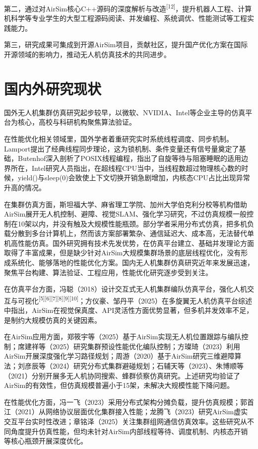 第二，通过对AirSim核心C++源码的深度解析与改造\textsuperscript{{[}12{]}}，提升机器人工程、计算机科学等专业学生的大型工程源码阅读、并发编程、系统调优、性能测试等工程实践能力。

第三，研究成果可集成到开源AirSim项目，贡献社区，提升国产优化方案在国际开源领域的影响力，推动无人机仿真技术的共同进步。

\section{国内外研究现状}

国外无人机集群仿真研究起步较早，以微软、NVIDIA、Intel等企业主导的仿真平台为核心，高校与科研机构聚焦算法验证。

在性能优化相关领域里，国外学者着重研究实时系统线程调度、同步机制。Lamport提出了经典线程同步理论，这为锁机制、条件变量还有信号量奠定了基础，Butenhof深入剖析了POSIX线程编程，指出了自旋等待与阻塞睡眠的适用边界所在，Intel研究人员指出，在超线程CPU当中，当线程数超过物理核心数的时候，yield()与sleep(0)会致使上下文切换开销急剧增加，内核态CPU占比出现异常升高的情况。

在集群仿真方面，斯坦福大学、麻省理工学院、加州大学伯克利分校等机构借助AirSim展开无人机控制、避障、视觉SLAM、强化学习研究，不过仿真规模一般控制在10架以内，并没有触及大规模性能瓶颈。部分学者采用分布式仿真，把多机负载分散到多台计算机上，然而该方案部署繁杂、通信延迟大、成本高，无法替代单机高性能仿真。国外研究拥有技术先发优势，在仿真平台建立、基础并发理论方面取得了丰富成果，但是缺少针对AirSim大规模集群场景的底层线程优化，没有形成系统化、能够落地的性能优化方案。国内无人机集群仿真研究近年来发展迅速，聚焦平台构建、算法验证、工程应用，性能优化研究逐步受到关注。

在仿真平台方面，冯聪（2018）设计交互式无人机集群编队仿真平台，强化人机交互与可视化\textsuperscript{{[}5{]}{[}6{]}{[}7{]}{[}8{]}{[}9{]}{[}10{]}}；方仪豪、邹丹平（2025）在多旋翼无人机仿真平台综述中指出，AirSim在视觉保真度、API灵活性方面优势显著，但多机并发效率不足，是制约大规模仿真的关键因素。

在AirSim应用方面，郑筱宇等（2025）基于AirSim实现无人机位置跟踪与编队控制；席建祥等（2025）研究集群预设性能优化编队控制；方璨琦（2023）利用AirSim开展深度强化学习路径规划；周游（2020）基于AirSim研究三维避障算法；刘彦辰等（2024）研究分布式集群避碰规划；石辅天等（2023）、朱博顺等（2021）分别开展多无人机协同搜索、蜂群侦察仿真研究。上述研究均验证了AirSim的有效性，但仿真规模普遍小于15架，未解决大规模性能下降问题。

在性能优化方面，冯一飞（2023）采用分布式架构分摊负载，提升仿真规模；郭首江（2021）从网络协议层面优化集群接入性能；龙腾飞（2023）研究AirSim虚实交互平台实时性改进；章铭泽（2025）关注集群组网通信仿真效率。这些研究从不同角度提升仿真性能，但均未针对AirSim内部线程等待、调度机制、内核态开销等核心瓶颈开展深度优化。

